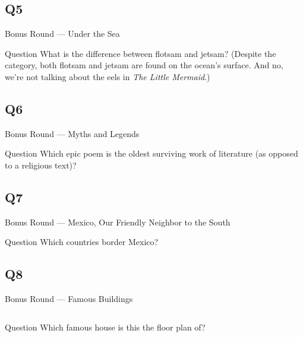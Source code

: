 \documentclass[11pt]{beamer}
\begin{document}
\subsection*{Q5}
\begin{frame}[t]{Bonus Round --- Under the Sea}
\vspace{-0.5em}
\begin{block}{Question}
What is the difference between flotsam and jetsam? (Despite the category, both flotsam and jetsam are found on the ocean's surface. And no, we're not talking about the eels in \emph{The Little Mermaid}.)
\end{block}
\end{frame}
\subsection*{Q6}
\begin{frame}[t]{Bonus Round --- Myths and Legends}
\vspace{-0.5em}
\begin{block}{Question}
Which epic poem is the oldest surviving work of literature (as opposed to a religious text)?
\end{block}
\end{frame}
\subsection*{Q7}
\begin{frame}[t]{Bonus Round --- Mexico, Our Friendly Neighbor to the South}
\vspace{-0.5em}
\begin{block}{Question}
Which countries border Mexico?
\end{block}
\end{frame}
\subsection*{Q8}
\begin{frame}[t]{Bonus Round --- Famous Buildings}
\vspace{-0.5em}
\begin{columns}[T,totalwidth=\linewidth]
\begin{column}{0.32\linewidth}
\begin{block}{Question}
Which famous house is this the floor plan of?
\end{block}
\end{column}
\begin{column}{0.65\linewidth}
\begin{center}
\texttt{[image: \{Images/fallingwaterfloorplan]}.jpg}
\end{center}
\end{column}
\end{columns}
\end{frame}
\end{document}
